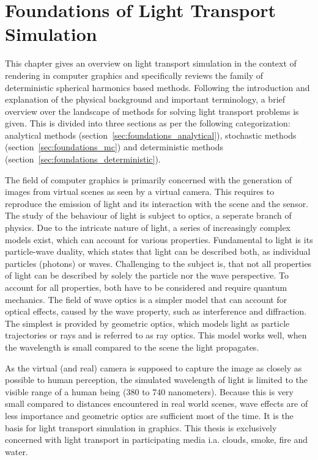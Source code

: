 \chapter{Foundations of Light Transport Simulation}
\label{sec:foundations}

This chapter gives an overview on light transport simulation in the context of rendering in computer graphics and specifically reviews the family of deterministic spherical harmonics based methods. Following the introduction and explanation of the physical background and important terminology, a brief overview over the landscape of methods for solving light transport problems is given. This is divided into three sections as per the following categorization: analytical methods (section~\ref{sec:foundations_analytical}), stochastic methods (section~\ref{sec:foundations_mc}) and deterministic methods (section~\ref{sec:foundations_deterministic}).

The field of computer graphics is primarily concerned with the generation of images from virtual scenes as seen by a virtual camera. This requires to reproduce the emission of light and its interaction with the scene and the sensor. The study of the behaviour of light is subject to optics, a seperate branch of physics. Due to the intricate nature of light, a series of increasingly complex models exist, which can account for various properties. Fundamental to light is its particle-wave duality, which states that light can be described both, as individual particles (photons) or waves. Challenging to the subject is, that not all properties of light can be described by solely the particle nor the wave perspective. To account for all properties, both have to be considered and require quantum mechanics. The field of wave optics is a simpler model that can account for optical effects, caused by the wave property, such as interference and diffraction. The simplest is provided by geometric optics, which models light as particle trajectories or rays and is referred to as ray optics. This model works well, when the wavelength is small compared to the scene the light propagates. 

As the virtual (and real) camera is supposed to capture the image as closely as possible to human perception, the simulated wavelength of light is limited to the visible range of a human being (380 to 740 nanometers). Because this is very small compared to distances encountered in real world scenes, wave effects are of less importance and geometric optics are sufficient most of the time. It is the basis for light transport simulation in graphics. This thesis is exclusively concerned with light transport in participating media i.a. clouds, smoke, fire and water.


